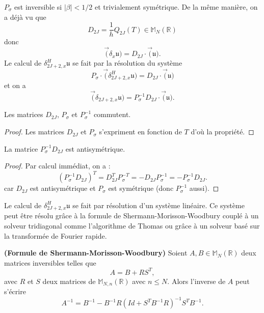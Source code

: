 $P_{\sigma}$ est inversible si $|\beta |<1/2$ et trivialement symétrique. 
De la même manière, on a déjà vu que 
\begin{equation}
D_{2J} = \dfrac{1}{h} Q_{2J}(T) \in \mathbb{M}_{N}(\mathbb{R})
\end{equation}
donc 
\begin{equation}
\vec (\delta_{x} \mathfrak{u}) = D_{2J} \cdot \vec (\mathfrak{u}).
\label{eq:systhermitien}
\end{equation}
Le calcul de $\delta^H_{2J+2,x} \mathfrak{u}$ se fait par la résolution du système
\begin{equation}
P_{\sigma} \cdot \vec (\delta_{2J+2,x}^H \mathfrak{u}) = D_{2J} \cdot \vec (\mathfrak{u})
\end{equation}
et on a 
\begin{equation}
\vec (\delta_{2J+2,x} \mathfrak{u} ) =P_{\sigma}^{-1} D_{2J} \cdot \vec (\mathfrak{u}).
\end{equation}

\begin{proposition}
Les matrices $D_{2J}$, $P_{\sigma}$ et $P^{-1}_{\sigma}$ commutent.
\end{proposition}

\begin{proof}
Les matrices $D_{2J}$ et $P_{\sigma}$ s'expriment en fonction de $T$ d'où la propriété.
\end{proof}

\begin{proposition}
La matrice $P^{-1}_{\sigma}D_{2J}$ est antisymétrique.
\label{prop:derhermi_antisym}
\end{proposition}

\begin{proof}
Par calcul immédiat, on a :
\begin{equation}
(P^{-1}_{\sigma}D_{2J})^T = D_{2J}^T P_{\sigma}^{-T} = - D_{2J} P_{\sigma}^{-1} = - P_{\sigma}^{-1} D_{2J}.
\end{equation}
car $D_{2J}$ est antisymétrique et $P_{\sigma}$ est symétrique (donc $P^{-1}_{\sigma}$ aussi). 
\end{proof}

Le calcul de $\delta_{2J+2,x}^H \mathfrak{u}$ se fait par résolution d'un système linéaire. Ce système peut être résolu grâce à la formule de Shermann-Morisson-Woodbury couplé à un solveur tridiagonal comme l'algorithme de Thomas ou grâce à un solveur basé sur la transformée de Fourier rapide.

\begin{proposition}
\textbf{(Formule de Shermann-Morisson-Woodbury)} Soient $A, B \in \mathbb{M}_N \left(\mathbb{R} \right)$ deux matrices inversibles telles que 
\begin{equation}
A = B + R S^T,
\end{equation}
avec $R$ et $S$ deux matrices de $\mathbb{M}_{N,n} \left(\mathbb{R} \right)$ avec $n \leq N$.
Alors l'inverse de $A$ peut s'écrire
\begin{equation}
A^{-1} = B^{-1} - B^{-1} R \left( Id + S^T B^{-1} R  \right)^{-1} S^T B^{-1}.
\label{eq:SMW}
\end{equation}
\end{proposition}

